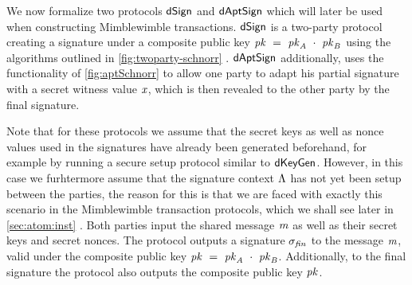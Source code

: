 We now formalize two protocols $\mathsf{dSign}$ and $\mathsf{dAptSign}$ which will later be used when constructing Mimblewimble transactions.
$\mathsf{dSign}$ is a two-party protocol creating a signature under a composite public key $\mathit{pk} ~=~ \mathit{pk}_{\mathit{A}} ~\cdot~ \mathit{pk}_{\mathit{B}}$ using the algorithms outlined in \cref{fig:twoparty-schnorr} .
$\mathsf{dAptSign}$ additionally, uses the functionality of \cref{fig:aptSchnorr} to allow one party to adapt his partial signature with a secret witness value $\mathit{x}$, which is then revealed to the other party by the final signature.

Note that for these protocols we assume that the secret keys as well as nonce values used in the signatures have already been generated beforehand, for example by running a secure setup protocol similar to $\mathsf{dKeyGen}$.
However, in this case we furhtermore assume that the signature context $\Lambda$ has not yet been setup between the parties, the reason for this is that we are faced with exactly this scenario in the Mimblewimble transaction protocols, which we shall see later in \cref{sec:atom:inst} .
Both parties input the shared message $\mathit{m}$ as well as their secret keys and secret nonces.
The protocol outputs a signature $\sigma_{\mathit{fin}}$ to the message $\mathit{m}$, valid under the composite public key $\mathit{pk} ~=~ \mathit{pk}_{\mathit{A}} ~\cdot~ \mathit{pk}_{\mathit{B}}$.
Additionally, to the final signature the protocol also outputs the composite public key $\mathit{pk}$.

